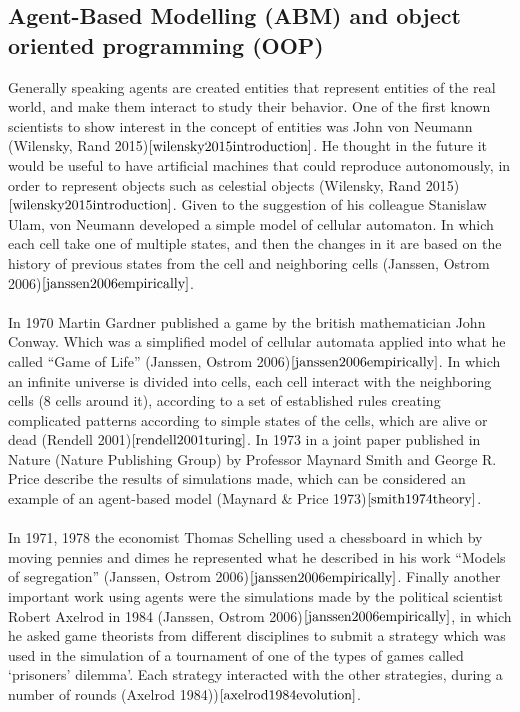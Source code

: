 \documentclass{article}
\begin{document}
\subsection{Agent-Based Modelling (ABM) and object oriented programming (OOP)}
Generally speaking agents are created entities that represent entities of the real world, and make them interact to study their behavior. One of the first known scientists to show interest in the concept of entities was John von Neumann (Wilensky, Rand 2015)$\cite{wilensky2015introduction}$. He thought in the future it would be useful to have artificial machines that could reproduce autonomously, in order to represent objects such as celestial objects (Wilensky, Rand 2015)$\cite{wilensky2015introduction}$. Given to the suggestion of his colleague Stanislaw Ulam, von Neumann developed a simple model of cellular automaton. In which each cell take one of multiple states, and then the changes in it are based on the history of previous states from the cell and neighboring cells (Janssen, Ostrom 2006)$\cite{janssen2006empirically}$.
\\\\In 1970 Martin Gardner published a game by the british mathematician John Conway. Which was a simplified model of cellular automata applied into what he called “Game of Life” (Janssen, Ostrom 2006)$\cite{janssen2006empirically}$. In which an infinite universe is divided into cells, each cell interact with the neighboring cells (8 cells around it), according to a set of established rules creating complicated patterns according to simple states of the cells, which are alive or dead (Rendell 2001)$\cite{rendell2001turing}$. In 1973 in a joint paper published in Nature (Nature Publishing Group)  by Professor Maynard Smith and George R. Price describe the results of simulations made, which can be considered an example of an agent-based model (Maynard \& Price 1973)$\cite{smith1974theory}$.
\\\\In 1971, 1978 the economist Thomas Schelling used a chessboard in which by moving pennies and dimes he represented what he described in his work ``Models of segregation'' (Janssen, Ostrom 2006)$\cite{janssen2006empirically}$.  Finally another important work using agents were the simulations made by the political scientist Robert Axelrod in 1984 (Janssen, Ostrom 2006)$\cite{janssen2006empirically}$, in which he asked game theorists from different disciplines to submit a strategy which was used in the simulation of a tournament of one of the types of games called `prisoners’ dilemma'. Each strategy interacted with the other strategies, during a number of rounds (Axelrod 1984))$\cite{axelrod1984evolution}$.
\end{document}
